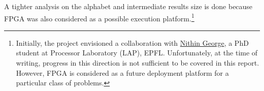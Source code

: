 A tighter analysis on the alphabet and intermediate results size is done because FPGA was also considered as a possible execution platform.\footnote{Initially, the project envisioned a collaboration with \href{mailto:nithin.george@epfl.ch}{Nithin George}, a PhD student at Processor Laboratory (LAP), EPFL. Unfortunately, at the time of writing, progress in this direction is not sufficient to be covered in this report. However, FPGA is considered as a future deployment platform for a particular class of problems.}


\newcommand\Cd[3][0,-1]{\put(#2){\put(.5,.5){\circle*{.3}}\put(.5,.5){\linethickness{1.5pt}\vector(#1){#3}}}} %
\def\Cg#1{\put(#1){\color{lightgray}\put(0,0){\polygon*(0,0)(0,1)(1,1)(1,0)}}} %
\def\Cz#1{\put(#1){\put(0,.35){\parbox{1\unitlength}{\centering\bf 0}}}} %
\def\Cm{\put(6.5,4.5){\circle*{.4}}\multiput(0,0)(1,0){9}{\line(0,1){8}}\multiput(0,0)(0,1){9}{\line(1,0){8}}} %
\def\Cfl#1{#1{0,6}#1{0,5}#1{1,5}#1{0,4}#1{1,4}#1{2,4}#1{0,3}#1{1,3}#1{2,3}#1{3,3}#1{0,2}#1{1,2}#1{2,2}#1{3,2}#1{4,2}
	#1{0,1}#1{1,1}#1{2,1}#1{3,1}#1{4,1}#1{5,1}#1{0,0}#1{1,0}#1{2,0}#1{3,0}#1{4,0}#1{5,0}#1{6,0}} %
\def\Cfd#1{#1{0,7}#1{1,6}#1{2,5}#1{3,4}#1{4,3}#1{5,2}#1{6,1}#1{7,0}} %
\def\Cfdu#1{#1{7,1}#1{6,2}#1{5,3}#1{4,4}#1{3,5}#1{2,6}#1{1,7}} %


\def\CFig#1#2{\begin{figure}[H]\begin{center}\setlength{\unitlength}{.6cm}\begin{picture}(8,9) #2 \Cm\end{picture}\end{center}\caption{#1}\end{figure}}

\newpage
